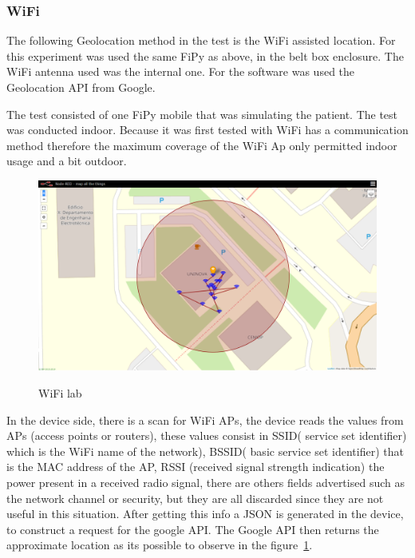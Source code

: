 \subsubsection{WiFi}
\label{subsubsec:Geo_WiFi}

The following Geolocation method in the test is the WiFi assisted location. For this experiment was used the same FiPy as above, in the belt box enclosure. The WiFi antenna used was the internal one. For the software was used the Geolocation API from Google.

The test consisted of one FiPy mobile that was simulating the patient. The test was conducted indoor. Because it was first tested with WiFi has a communication method therefore the maximum coverage of the WiFi Ap only permitted indoor usage and a bit outdoor.

\begin{figure}[htbp]
  \centering

    {\includegraphics[width=0.6\linewidth]{Chapters/Figures/wifilab.png}}%

  \caption{WiFi lab}
  \label{fig:WiFi_geo}
\end{figure}
In the device side, there is a scan for WiFi APs,  the device reads the values from APs  (access points or routers), these values consist in SSID( service set identifier) which is the WiFi name of the network),
BSSID( basic service set identifier) that is the  MAC address of the AP, RSSI (received signal strength indication) the power present in a received radio signal, there are others fields advertised such as the network channel or security, but they are all discarded since they are not useful in this situation.
After getting this info a JSON is generated in the device, to construct a request for the google API.
The Google API then returns the approximate location as its possible to observe in the figure~\ref{fig:WiFi_geo}.\newline


